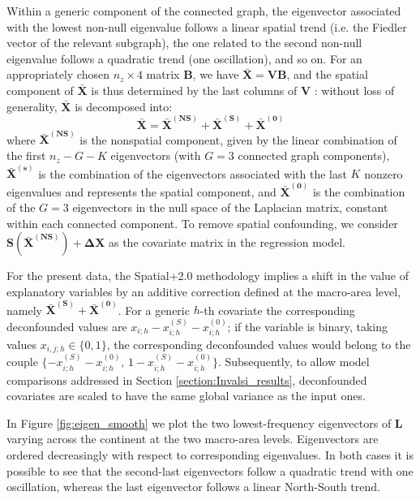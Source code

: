 \documentclass[openany, 11pt, oneside]{book}
\begin{document}
Within a generic component of the connected graph, the eigenvector associated with the lowest non-null eigenvalue follows a linear spatial trend (i.e. the Fiedler vector of the relevant subgraph), the one related to the second non-null eigenvalue follows a quadratic trend (one oscillation), and so on.
For an appropriately chosen $n_z \times 4$ matrix $\boldsymbol{B}$, we have $\boldsymbol{\bar{X}} = \boldsymbol{VB}$, and the spatial component of $\boldsymbol{\bar{X}}$ is thus determined by the last columns of $\boldsymbol{V}$ \parencite{Urdangarin24}: without loss of generality, $\boldsymbol{\bar{X}}$ is decomposed into:
$$
\boldsymbol{\bar{X} }= \boldsymbol{\bar{X}^{(NS)}} + \boldsymbol{\bar{X}^{(S)}} +\boldsymbol{ \bar{X}^{(0)}}
$$
where $\boldsymbol{\bar{X}^{(NS)}}$ is the nonspatial component, given by the linear combination of the first $n_z-G-K$ eigenvectors (with $G=3$ connected graph components), $\boldsymbol{\bar{X}^{(s)}}$ is the combination of the eigenvectors associated with the last $K$ nonzero eigenvalues and represents the spatial component, and $\boldsymbol{\bar{X}^{(0)}}$ is the combination of the $G=3$ eigenvectors in the null space of the Laplacian matrix, constant within each connected component. To remove spatial confounding, we consider $\boldsymbol{S} \left(\boldsymbol{\bar{X}^{(NS)}} \right) + \boldsymbol{ \Delta X}$ as the covariate matrix in the regression model. 

For the present data, the Spatial+2.0 methodology implies a shift in the value of explanatory variables by an additive correction defined at the macro-area level, namely $\boldsymbol{\bar{X}^{(S)}} + \boldsymbol{\bar{X}^{(0)}}$. For a generic $h$-th covariate the corresponding deconfounded values are $x_{i;h} -x_{i;h}^{(S)}-x_{i;h}^{(0)}$; if the variable is binary, taking values $x_{i,j;h} \in \lbrace{0, 1\rbrace}$, the corresponding deconfounded values would belong to the couple $\lbrace -x_{i;h}^{(S)}-x_{i;h}^{(0)}, \, 1 -x_{i;h}^{(S)}-x_{i;h}^{(0)}\rbrace$. Subsequently, to allow model comparisons addressed in Section \ref{section:Invalsi_results}, deconfounded covariates are scaled to have the same global variance as the input ones.

In Figure \ref{fig:eigen_smooth} we plot the two lowest-frequency eigenvectors of $\boldsymbol{L}$ varying across the continent at the two macro-area levels. Eigenvectors are ordered decreasingly with respect to corresponding eigenvalues. In both cases it is possible to see that the second-last eigenvectors follow a quadratic trend with one oscillation, whereas the last eigenvector follows a linear North-South trend.  
\end{document}
